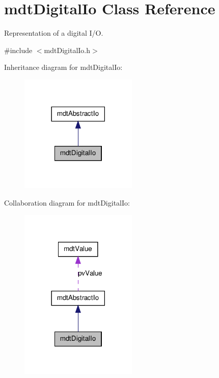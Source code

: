 \hypertarget{classmdt_digital_io}{
\section{mdtDigitalIo Class Reference}
\label{classmdt_digital_io}
}


Representation of a digital I/O.  




{\ttfamily \#include $<$mdtDigitalIo.h$>$}



Inheritance diagram for mdtDigitalIo:\nopagebreak
\begin{figure}[H]
\begin{center}
\leavevmode
\includegraphics[width=158pt]{classmdt_digital_io__inherit__graph}
\end{center}
\end{figure}


Collaboration diagram for mdtDigitalIo:
\nopagebreak
\begin{figure}[H]
\begin{center}
\leavevmode
\includegraphics[width=158pt]{classmdt_digital_io__coll__graph}
\end{center}
\end{figure}
